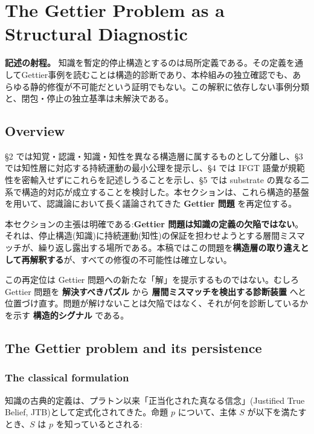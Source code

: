 \section{The Gettier Problem as a Structural Diagnostic}

\noindent\textbf{記述の射程。} 知識を暫定的停止構造とするのは局所定義である。その定義を通してGettier事例を読むことは構造的診断であり、本枠組みの独立確認でも、あらゆる静的修復が不可能だという証明でもない。この解釈に依存しない事例分類と、閉包・停止の独立基準は未解決である。



\subsection{Overview}


\S{}2 では知覚・認識・知識・知性を異なる構造層に属するものとして分離し、\S{}3 では知性層に対応する持続運動の最小公理を提示し、\S{}4 では IFGT 語彙が規範性を密輸入せずにこれらを記述しうることを示し、\S{}5 では substrate の異なる二系で構造的対応が成立することを検討した。本セクションは、これら構造的基盤を用いて、認識論において長く議論されてきた \textbf{Gettier 問題} を再定位する。

本セクションの主張は明確である:\textbf{Gettier 問題は知識の定義の欠陥ではない}。それは、停止構造(知識)に持続運動(知性)の保証を担わせようとする層間ミスマッチが、繰り返し露出する場所である。本稿ではこの問題を\textbf{構造層の取り違えとして再解釈する}が、すべての修復の不可能性は確立しない。

この再定位は Gettier 問題への新たな「解」を提示するものではない。むしろ Gettier 問題を \textbf{解決すべきパズル} から \textbf{層間ミスマッチを検出する診断装置} へと位置づけ直す。問題が解けないことは欠陥ではなく、それが何を診断しているかを示す \textbf{構造的シグナル} である。

\subsection{The Gettier problem and its persistence}


\subsubsection{The classical formulation}


知識の古典的定義は、プラトン以来「正当化された真なる信念」(Justified True Belief, JTB)として定式化されてきた。命題 $p$ について、主体 $S$ が以下を満たすとき、$S$ は $p$ を知っているとされる:

